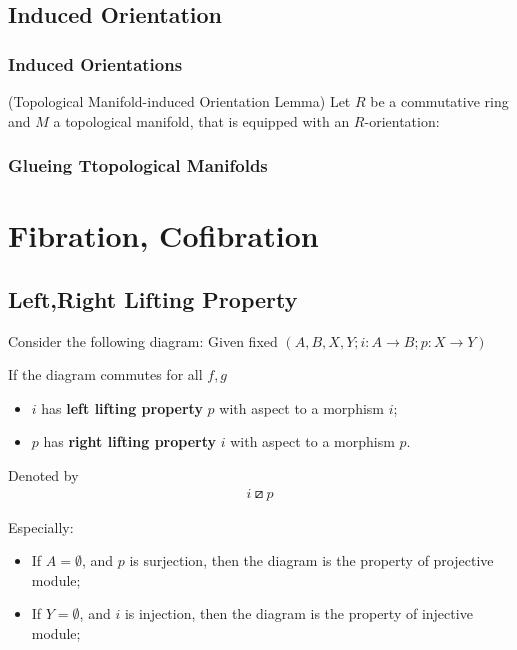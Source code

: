 \documentclass[Total.tex]{subfiles}
\begin{document}
			\section{Induced Orientation}
				\subsection{Induced Orientations}
					\begin{lemma}
						(Topological Manifold-induced Orientation Lemma) Let $R$ be a commutative ring and $M$ a topological manifold, that is equipped with an $R$-orientation:
					\end{lemma}
				\subsection{Glueing Ttopological Manifolds}
	\chapter{Fibration, Cofibration}
		\section{Left,Right Lifting Property}
			\begin{Def}Consider the following diagram: Given fixed $(A,B,X,Y;i:A\rightarrow B;p:X\rightarrow Y)$
				\begin{center}
				\end{center}
				If the diagram commutes for all $f,g$
				\begin{itemize}
					\item $i$ has \textbf{left lifting property} $p$ with aspect to a morphism $i$; 
					
					\item $p$ has \textbf{right lifting property} $i$ with aspect to a morphism $p$. 
				\end{itemize}
				Denoted by 
				\begin{gather*}
					i\boxslash p
				\end{gather*}
			\end{Def}
			
			Especially:
			
			\begin{itemize}
				\item If $A=\emptyset$, and $p$ is surjection, then the diagram is the property of projective module;
				\item If $Y=\emptyset$, and $i$ is injection, then the diagram is the property of injective module;
			\end{itemize}
			
\end{document}
